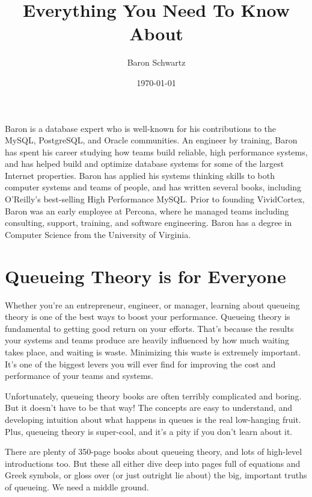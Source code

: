 \documentclass{vivid_layout_pdf}
\title{Everything You Need To Know About}{Queueing Theory}
\date{\today}
\author{Baron Schwartz}{img/baron}
\begin{document}
\maketitle		%
\begin{bio}		%
Baron is a database expert who is well-known for his contributions to the MySQL, PostgreSQL, and Oracle communities. An engineer by training, Baron has spent his career studying how teams build reliable, high performance systems, and has helped build and optimize database systems for some of the largest Internet properties. Baron has applied his systems thinking skills to both computer systems and teams of people, and has written several books, including O'Reilly's best-selling High Performance MySQL. Prior to founding VividCortex, Baron was an early employee at Percona, where he managed teams including consulting, support, training, and software engineering. Baron has a degree in Computer Science from the University of Virginia.
\end{bio}
\tableofcontents	%

\section{Queueing Theory is for Everyone}

Whether you're an entrepreneur, engineer, or manager, learning about queueing theory is one of the best ways to boost your performance. Queueing theory is fundamental to getting good return on your efforts. That's because the results your systems and teams produce are heavily influenced by how much waiting takes place, and waiting is waste. Minimizing this waste is extremely important. It's one of the biggest levers you will ever find for improving the cost and performance of your teams and systems.

Unfortunately, queueing theory books are often terribly complicated and boring. But it doesn't have to be that way! The concepts are easy to understand, and developing intuition about what happens in queues is the real low-hanging fruit. Plus, queueing theory is super-cool, and it's a pity if you don't learn about it.

There are plenty of 350-page books about queueing theory, and lots of high-level introductions too. But these all either dive deep into pages full of equations and Greek symbols, or gloss over (or just outright lie about) the big, important truths of queueing. We need a middle ground.
\end{document}
